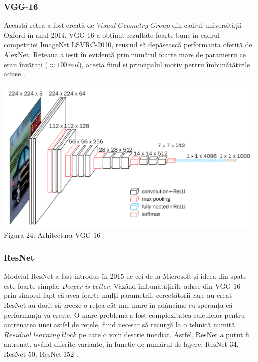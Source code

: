 \subsubsection{VGG-16}
Această rețea a fost creată de $Visual \; Geometry \; Group$ din cadrul universității Oxford în anul 2014. VGG-16 a obținut rezultate foarte bune în cadrul competiției ImageNet LSVRC-2010, reușind să depășească performanța oferită de AlexNet. Rețeaua a ieșit în evidență prin numărul foarte mare de parametrii ce erau învățați ($\approx 100 \, mil$), acesta fiind și principalul motiv pentru îmbunătățirile aduse \cite{vgg16}. 

\begin{center}
\includegraphics[scale=1]{vgg16} \\
Figura 24: Arhitectura VGG-16
\end{center}

\subsubsection{ResNet}
Modelul ResNet a fost introdus în 2015 de cei de la Microsoft și ideea din spate este foarte simplă: \textit{Deeper is better}. Văzând îmbunătățirile aduse din VGG-16 prin simplul fapt că avea foarte mulți parametrii, cercetătorii care au creat ResNet au dorit să creeze o rețea cât mai mare în adâncime cu speranța că performanța va crește. O mare problemă a fost complexitatea calculelor pentru antrenarea unei astfel de rețele, fiind necesar să recurgă la o tehnică numită $Residual \; learning \; block$ pe care o vom descrie imediat. Asrfel, ResNet a putut fi antrenat, având diferite variante, în funcție de numărul de layere: ResNet-34, ResNet-50, ResNet-152 \cite{resnet}. 

